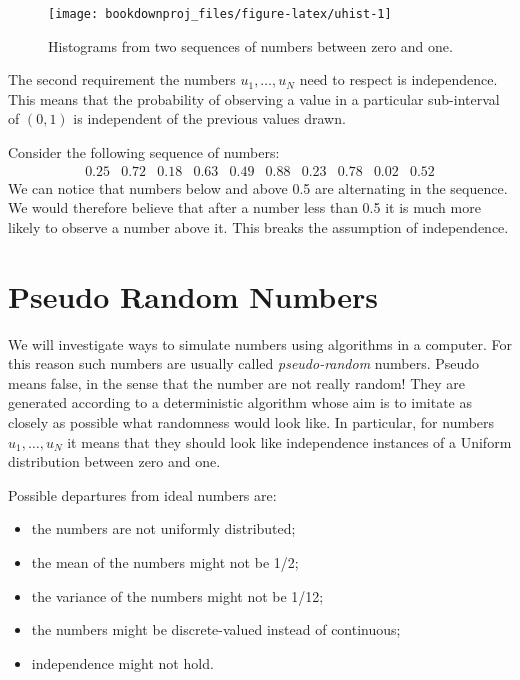 \documentclass[
]{book}
\theoremstyle{definition}
\theoremstyle{definition}
\theoremstyle{definition}
\theoremstyle{definition}
\theoremstyle{remark}
\begin{document}
\begin{figure}

{\centering \texttt{[image: bookdownproj\_files/figure-latex/uhist-1]} 

}

\caption{Histograms from two sequences of numbers between zero and one.}\label{fig:uhist}
\end{figure}

The second requirement the numbers \(u_1,\dots,u_N\) need to respect is independence. This means that the probability of observing a value in a particular sub-interval of \((0,1)\) is independent of the previous values drawn.

Consider the following sequence of numbers:
\[
\begin{array}{cccccccccc}
0.25 & 0.72 & 0.18 & 0.63 & 0.49 & 0.88 & 0.23 & 0.78 & 0.02 & 0.52
\end{array}
\]
We can notice that numbers below and above 0.5 are alternating in the sequence. We would therefore believe that after a number less than 0.5 it is much more likely to observe a number above it. This breaks the assumption of independence.

\hypertarget{pseudo-random-numbers}{%
\section{Pseudo Random Numbers}\label{pseudo-random-numbers}}

We will investigate ways to simulate numbers using algorithms in a computer. For this reason such numbers are usually called \emph{pseudo-random} numbers. Pseudo means false, in the sense that the number are not really random! They are generated according to a deterministic algorithm whose aim is to imitate as closely as possible what randomness would look like. In particular, for numbers \(u_1,\dots,u_N\) it means that they should look like independence instances of a Uniform distribution between zero and one.

Possible departures from ideal numbers are:

\begin{itemize}
\item
  the numbers are not uniformly distributed;
\item
  the mean of the numbers might not be 1/2;
\item
  the variance of the numbers might not be 1/12;
\item
  the numbers might be discrete-valued instead of continuous;
\item
  independence might not hold.
\end{itemize}
\end{document}
